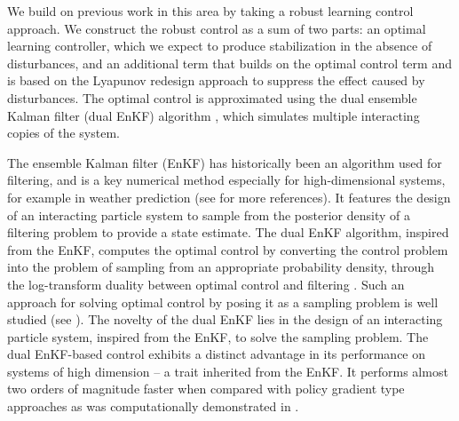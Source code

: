 \documentclass[letterpaper, 10 pt, conference]{ieeeconf}  %
\begin{document}
We build on previous work in this area \cite{zhang-2024}  by taking a robust learning control approach. We construct the robust control as a sum of two parts: an optimal learning controller, which we expect to produce stabilization in the absence of disturbances, and an additional term that builds on the optimal control term and is based on the Lyapunov redesign approach \cite{khalil} to suppress the effect caused by disturbances. 
The optimal control is approximated using the dual ensemble Kalman filter (dual EnKF) algorithm \cite{joshi-2022}, which simulates multiple interacting copies of the system.

The ensemble Kalman filter (EnKF) \cite{yang-2016,amir-2019} has historically been an algorithm used for filtering, and is a key numerical method especially for high-dimensional systems, for example in weather prediction \cite{evensen2006} (see \cite{bishop-2023} for more references). It features the design of an interacting particle system to sample from the posterior density of a filtering problem to provide a state estimate. 
The dual EnKF algorithm, inspired from the EnKF, computes the optimal control by converting the control problem into the problem of sampling from an appropriate probability density, through the log-transform duality between optimal control and filtering \cite{fleming-1982}. Such an approach for solving optimal control by posing it as a sampling problem is well studied
(see \cite{todorov-2007,kappen-2005,rawlik2013stochastic,hoffman-2017,levine-2018}). 
The novelty of the dual EnKF lies in the design of an interacting particle system, inspired from the EnKF, to solve the sampling problem. 
The dual EnKF-based control exhibits a distinct advantage in its performance on systems of high dimension -- a trait inherited from the EnKF. It performs almost two orders of magnitude faster when compared with policy gradient type approaches \cite{mihailo-2021-tac,fazel-2018-mlr} as was computationally demonstrated in \cite{joshi-2022}. 
\end{document}
